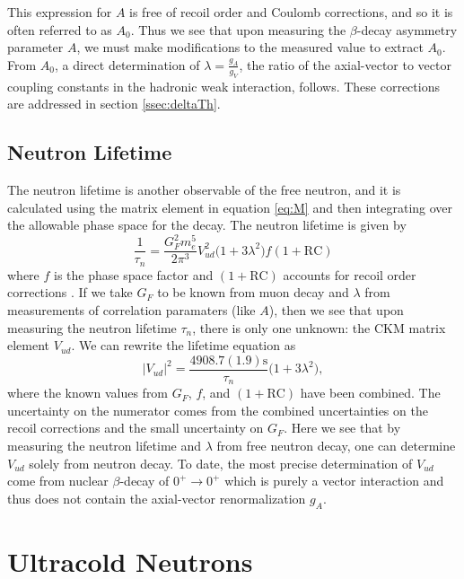 This expression for $A$ is free of recoil order and Coulomb corrections, and so it is
often referred to as $A_0$. Thus we see that upon measuring the $\beta$-decay
asymmetry parameter $A$, we must make modifications to the measured value to extract
$A_0$. From $A_0$, a direct determination of $\lambda = \frac{g_A}{g_V}$, the ratio of the axial-vector to vector
coupling constants in the hadronic weak interaction, follows.
These corrections are addressed in section \ref{ssec:deltaTh}.

\subsection{Neutron Lifetime}
The neutron lifetime is another observable of the free neutron, and it is calculated using the matrix
element in equation \ref{eq:M} and then integrating over the allowable phase space for the decay.
The neutron lifetime is given by
%
\begin{equation}
  \frac{1}{\tau_n} = \frac{G_F^2 m_e^5}{2\pi^3}V_{ud}^2 \big(1+3\lambda^2)f(1+\mathrm{RC})
\end{equation}
%
where $f$ is the phase space factor and $(1+\mathrm{RC})$ accounts for recoil order
corrections \cite{czarnecki2004precision}. If we take $G_F$ to be known from muon decay and $\lambda$ from
measurements of correlation paramaters (like $A$), then we see that upon measuring the
neutron lifetime $\tau_n$, there is only one unknown: the CKM matrix element $V_{ud}$.
We can rewrite the lifetime equation as
%
\begin{equation}
  |V_{ud}|^2 = \frac{4908.7(1.9)\mathrm{s}}{\tau_n}\big(1+3\lambda^2\big),
\end{equation}
where the known values from $G_F$, $f$, and $(1+\mathrm{RC})$ have been combined.
The uncertainty on the numerator comes from the combined uncertainties on
the recoil corrections and the small uncertainty on $G_F$. Here we see that
by measuring the neutron lifetime and $\lambda$ from free neutron decay,
one can determine $V_{ud}$ solely from neutron decay. 
To date, the most precise determination of $V_{ud}$ come from nuclear
$\beta$-decay of $0^+ \rightarrow 0^+$ which is purely a vector interaction
and thus does not contain the axial-vector renormalization $g_A$.



\section{Ultracold Neutrons}

